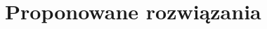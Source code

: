 \documentclass[./FM_mgr.tex]{subfiles}
\begin{document}
\chapter{Proponowane rozwiązania} \label{chapter:proposed}
\end{document}
